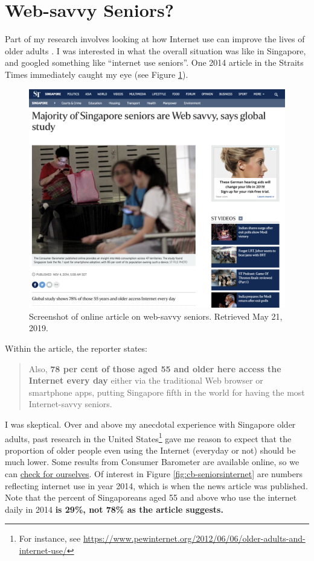 \documentclass[
  openany]{book}
\begin{document}
\hypertarget{websavvy}{%
\section{Web-savvy Seniors?}\label{websavvy}}

Part of my research involves looking at how Internet use can improve the lives of older adults \citep[see][]{ang_going_2018}. I was interested in what the overall situation was like in Singapore, and googled something like ``internet use seniors''. One 2014 article in the Straits Times immediately caught my eye (see Figure \ref{fig:st-websavvyseniors}).

\begin{figure}

{\centering \includegraphics[width=0.8\linewidth]{images/proportion/STwebsavvyseniors} 

}

\caption{Screenshot of online article on web-savvy seniors. Retrieved May 21, 2019.}\label{fig:st-websavvyseniors}
\end{figure}

Within the article, the reporter states:

\begin{quote}
Also, \textbf{78 per cent of those aged 55 and older here access the Internet every day} either via the traditional Web browser or smartphone apps, putting Singapore fifth in the world for having the most Internet-savvy seniors.
\end{quote}

I was skeptical. Over and above my anecdotal experience with Singapore older adults, past research in the United States\footnote{For instance, see \url{https://www.pewinternet.org/2012/06/06/older-adults-and-internet-use/}} gave me reason to expect that the proportion of older people even using the Internet (everyday or not) should be much lower. Some results from Consumer Barometer are available online, so we can \href{https://www.consumerbarometer.com/en/trending/?countryCode=SG\&category=TRN-AGE-55-PLUS}{check for ourselves}. Of interest in Figure \ref{fig:cb-seniorsinternet} are numbers reflecting internet use in year 2014, which is when the news article was published. Note that the percent of Singaporeans aged 55 and above who use the internet daily in 2014 \textbf{is 29\%, not 78\% as the article suggests.}
\end{document}
